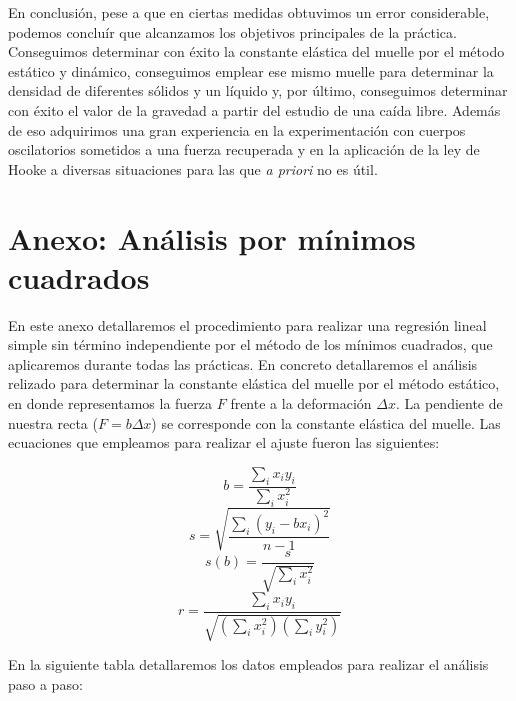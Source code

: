\documentclass[a4paper,12pt,titlepage]{report}
\begin{document}
\newpage

\par En conclusión, pese a que en ciertas medidas obtuvimos un error considerable, podemos concluír que alcanzamos los objetivos principales de la práctica. Conseguimos determinar con éxito la constante elástica del muelle por el método estático y dinámico, conseguimos emplear ese mismo muelle para determinar la densidad de diferentes sólidos y un líquido y, por último, conseguimos determinar con éxito el valor de la gravedad a partir del estudio de una caída libre. Además de eso adquirimos una gran experiencia en la experimentación con cuerpos oscilatorios sometidos a una fuerza recuperada y en la aplicación de la ley de Hooke a diversas situaciones para las que \textit{a priori} no es útil.

\newpage

\section{Anexo: Análisis por mínimos cuadrados}

En este anexo detallaremos el procedimiento para realizar una regresión lineal simple sin término independiente por el método de los mínimos cuadrados, que aplicaremos durante todas las prácticas. En concreto detallaremos el análisis relizado para determinar la constante elástica del muelle por el método estático, en donde representamos la fuerza $F$ frente a la deformación $\Delta x$. La pendiente de nuestra recta ($F=b\Delta x$) se corresponde con la constante elástica del muelle. Las ecuaciones que empleamos para realizar el ajuste fueron las siguientes:

\begin{equation}
    b=\frac{\sum_{i}x_{i}y_{i}}{\sum_{i}x_{i}^2}
\end{equation}
\begin{equation}
    s=\sqrt{\frac{\sum_{i}(y_{i}-bx_{i})^2}{n-1}}
\end{equation}
\begin{equation}
    s(b)=\frac{s}{\sqrt{\sum_{i}x_{i}^2}}
\end{equation}
\begin{equation}
    r=\frac{\sum_{i}x_{i}y_{i}}{\sqrt{(\sum_{i}x_{i}^2)(\sum_{i}y_{i}^2)}}
\end{equation}

En la siguiente tabla detallaremos los datos empleados para realizar el análisis paso a paso:
\end{document}

